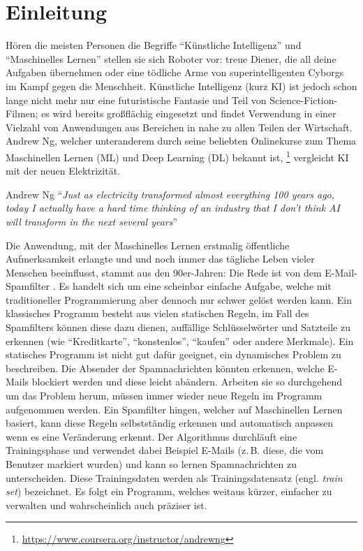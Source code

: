 \chapter{Einleitung}
Hören die meisten Personen die Begriffe \enquote{Künstliche Intelligenz}
und \enquote{Maschinelles Lernen} stellen sie sich Roboter vor:
treue Diener, die all deine Aufgaben übernehmen oder eine tödliche Arme
von superintelligenten Cyborgs im Kampf gegen die Menschheit.
Künstliche Intelligenz (kurz KI) ist jedoch schon lange nicht mehr nur eine futuristische
Fantasie und Teil von Science-Fiction-Filmen; es wird bereits großflächig
eingesetzt und findet Verwendung in einer Vielzahl von Anwendungen aus Bereichen
in nahe zu allen Teilen der Wirtschaft. Andrew Ng,
welcher unteranderem durch seine beliebten Onlinekurse zum Thema
Maschinellen Lernen (ML) und Deep Learning (DL)
bekannt ist,
\footnote{\url{https://www.coursera.org/instructor/andrewng}}
vergleicht KI mit der neuen Elektrizität.
\begin{aquote}{Andrew Ng \parencite{online:ai-andrew-ng}}
  \enquote{\textit{Just as electricity transformed almost everything 100 years ago,
      today I actually have a hard time thinking
      of an industry that I don’t think AI will
      transform in the next several years}}
\end{aquote}
Die Anwendung, mit der Maschinelles Lernen erstmalig öffentliche Aufmerksamkeit
erlangte und und noch immer das tägliche Leben vieler Menschen beeinflusst,
stammt aus den 90er-Jahren:
Die Rede ist von dem E-Mail-Spamfilter \parencite[1]{book:hands-on-ml}.
Es handelt sich um eine scheinbar einfache Aufgabe, welche
mit traditioneller Programmierung aber dennoch nur schwer gelöst werden kann.
Ein klassisches Programm besteht aus vielen statischen Regeln,
im Fall des Spamfilters können diese dazu dienen, auffällige Schlüsselwörter und
Satzteile zu erkennen (wie \enquote{Kreditkarte}, \enquote{konstenlos}, \enquote{kaufen} oder
andere Merkmale).
Ein statisches Programm ist nicht gut dafür geeignet, ein dynamisches Problem
zu beschreiben. Die Absender der Spamnachrichten könnten erkennen, welche E-Mails blockiert werden
und diese leicht abändern. Arbeiten sie so durchgehend um das Problem herum,
müssen immer wieder neue Regeln im Programm aufgenommen werden. Ein Spamfilter hingen,
welcher auf Maschinellen Lernen basiert, kann diese Regeln
selbstständig erkennen und automatisch anpassen wenn es eine Veränderung erkennt.
Der Algorithmus durchläuft eine Trainingsphase und verwendet dabei
Beispiel E-Mails (z.\,B. diese, die vom Benutzer markiert wurden)
und kann so lernen Spamnachrichten zu unterscheiden.
Diese Trainingsdaten werden als Trainingsdatensatz (engl. \textit{train set})
bezeichnet.
Es folgt ein Programm, welches weitaus kürzer,
einfacher zu verwalten und wahrscheinlich auch präziser ist.

